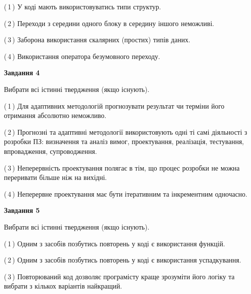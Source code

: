 \documentclass[10pt, ukrainian]{article}
\begin{document}
{\begin {large}
(\,1\,) У коді мають використовуватись типи структур. %



(\,2\,) Переходи з середини одного блоку в середину іншого неможливі. %



(\,3\,) Заборона використання скалярних (простих) типів даних. %



(\,4\,) Використання оператора безумовного переходу. %


{\begin {center}\textbf{Завдання 4}\end {center}}\par
Вибрати всі істинні твердження (якщо існують).\par
\vspace{2mm}



(\,1\,) Для адаптивних методологій прогнозувати результат чи терміни його отримання абсолютно неможливо. %



(\,2\,) Прогнозні та адаптивні методології використовують одні ті самі діяльності з розробки ПЗ: визначення та аналіз вимог, проектування, реалізація, тестування, впровадження, супроводження. %



(\,3\,) Неперервність проектування полягає в тім, що процес розробки не можна переривати більше ніж на вихідні. %



(\,4\,) Неперервне проектування має бути ітеративним та інкрементним одночасно. %


{\begin {center}\textbf{Завдання 5}\end {center}}\par
Вибрати всі істинні твердження (якщо існують).\par
\vspace{2mm}



(\,1\,) Одним з засобів позбутись повторень у коді є використання функцій. %



(\,2\,) Одним з засобів позбутись повторень у коді є використання успадкування. %



(\,3\,) Повторюваний код дозволяє програмісту краще зрозуміти його логіку та вибрати з кількох варіантів найкращий. %




\end{large}}
\end{document}

